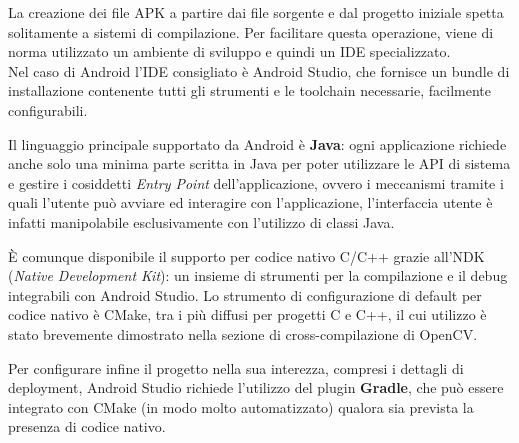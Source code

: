La creazione dei file APK a partire dai file sorgente e dal progetto iniziale spetta solitamente a sistemi di compilazione.
Per facilitare questa operazione, viene di norma utilizzato un ambiente di sviluppo e quindi un IDE specializzato.\\
Nel caso di Android l'IDE consigliato è Android Studio, che fornisce un bundle di installazione contenente tutti gli strumenti
e le toolchain necessarie, facilmente configurabili.

Il linguaggio principale supportato da Android è \textbf{Java}: ogni applicazione richiede anche solo una minima parte scritta 
in Java per poter utilizzare le API di sistema e gestire i cosiddetti \emph{Entry Point} dell'applicazione, ovvero i meccanismi 
tramite i quali l'utente può avviare ed interagire con l'applicazione, l'interfaccia utente è infatti manipolabile esclusivamente
con l'utilizzo di classi Java.

È comunque disponibile il supporto per codice nativo C/C++ grazie all'NDK (\emph{Native Development Kit}): un insieme di strumenti
per la compilazione e il debug integrabili con Android Studio. Lo strumento di configurazione di default per codice nativo è 
CMake, tra i più diffusi per progetti C e C++, il cui utilizzo è stato brevemente dimostrato nella sezione di cross-compilazione 
di OpenCV.

Per configurare infine il progetto nella sua interezza, compresi i dettagli di deployment, Android Studio richiede l'utilizzo 
del plugin \textbf{Gradle}, che può essere integrato con CMake (in modo molto automatizzato) qualora sia prevista la 
presenza di codice nativo.

